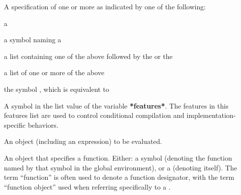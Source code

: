 \begin{glossary-list}

%
%
%
%
A specification of one or more  as indicated by
one of the following:
\begin{tightitemize}
\item a 
\item a symbol naming a 
\item
{}%
%
a list containing one of the above followed by the 
 or the  
\item a list of one or more of the above
\item the symbol , which is equivalent to
\end{tightitemize}


\glent[feature]
%
%
%
A symbol in the list value of the variable \textbf{*features*}.  The features
in this features list are used to control conditional compilation and
implementation-specific behaviors.


\glent[form]
%
%
%
%
%
An object (including an expression) to be evaluated.


%
%
%
%
%
An object that specifies a function.  Either: a symbol (denoting the function
named by that symbol in the global environment), or a 
(denoting itself).  The term ``function'' is often used to denote a
function designator, with the term ``function object'' used when referring
specifically to a .



\end{glossary-list}
